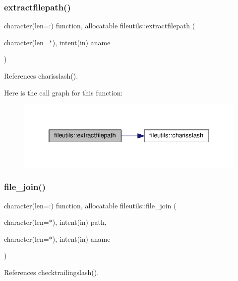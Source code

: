 \subsubsection{\texorpdfstring{extractfilepath()}{extractfilepath()}}
{\footnotesize\ttfamily character(len=\+:) function, allocatable fileutils\+::extractfilepath (\begin{DoxyParamCaption}\item[{character(len=$\ast$), intent(in)}]{aname }\end{DoxyParamCaption})\hspace{0.3cm}{\ttfamily [private]}}



References charisslash().

Here is the call graph for this function\+:
\nopagebreak
\begin{figure}[H]
\begin{center}
\leavevmode
\includegraphics[width=336pt]{namespacefileutils_a5debf7f081524e507253598ba943ad1a_cgraph}
\end{center}
\end{figure}
\mbox{\label{namespacefileutils_abc59cd6627541557f05e51e8571b77d6}} 
\subsubsection{\texorpdfstring{file\+\_\+join()}{file\_join()}}
{\footnotesize\ttfamily character(len=\+:) function, allocatable fileutils\+::file\+\_\+join (\begin{DoxyParamCaption}\item[{character(len=$\ast$), intent(in)}]{path,  }\item[{character(len=$\ast$), intent(in)}]{aname }\end{DoxyParamCaption})\hspace{0.3cm}{\ttfamily [private]}}



References checktrailingslash().

